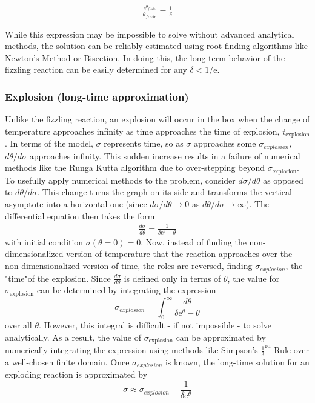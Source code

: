 \documentclass{article}
\begin{document}
\begin{align*}
   \frac{\text{e}^{\theta_{fizzle}}}{\theta_{fizzle}} = \frac{1}{\delta} 
\end{align*}

\noindent While this expression may be impossible to solve without advanced analytical methods, the solution can be reliably estimated using root finding algorithms like Newton's Method or Bisection. In doing this, the long term behavior of the fizzling reaction can be easily determined for any $\delta < 1/\text{e}$. 

\subsubsection*{Explosion (long-time approximation)}
Unlike the fizzling reaction, an explosion will occur in the box when the change of temperature approaches infinity as time approaches the time of explosion, $t_\text{explosion}$. In terms of the model, $\sigma$ represents time, so as $\sigma$ approaches some $\sigma_{explosion}$, $d\theta/d\sigma$ approaches infinity. 
This sudden increase results in a failure of numerical methods like the Runga Kutta algorithm due to over-stepping beyond $\sigma_\text{explosion}$.  To usefully apply numerical methods to the problem, consider $d\sigma/d\theta$ as opposed to $d\theta/d\sigma$.  This change turns the graph on its side and transforms the vertical asymptote into a horizontal one (since $d\sigma/d\theta \to 0$ as $d\theta/d\sigma\to\infty$). The differential equation then takes the form 
\begin{align*}
    \frac{d\sigma}{d\theta} = \frac{1}{\delta \text{e}^\theta - \theta}
\end{align*}
with initial condition $\sigma(\theta = 0) = 0$.  Now, instead of finding the non-dimensionalized version of temperature that the reaction approaches over the non-dimensionalized version of time, the roles are reversed, finding $\sigma_{explosion}$, the "time"of the explosion. Since $\frac{d\sigma}{d\theta}$ is defined only in terms of $\theta$, the value for $\sigma_\text{explosion}$ can be determined by integrating the expression $$\sigma_{explosion} = \int_0^\infty \frac{d\theta}{\delta \text{e}^\theta - \theta}$$ over all $\theta$. However, this integral is difficult - if not impossible - to solve analytically. As a result, the value of $\sigma_\text{explosion}$ can be approximated by numerically integrating the expression using methods like Simpson's ${\frac{1}{3}}^\text{rd}$ Rule over a well-chosen finite domain. Once $\sigma_{explosion}$ is known, the long-time solution for an exploding reaction is approximated by $$\sigma\approx \sigma_{explosion} - \frac{1}{\delta\text{e}^{\theta}}$$
\end{document}
